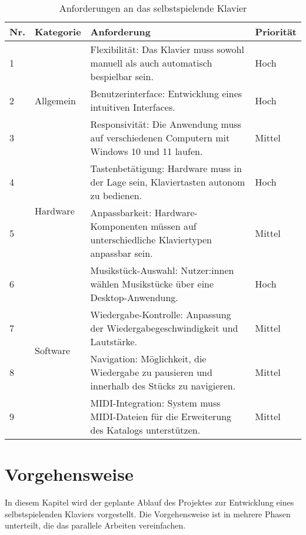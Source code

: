\begin{table}[ht]
    \centering
    \begin{tabular}{ | m{1cm} | m{2cm} | m{8cm} | m{2cm} | }
        \hline
        \textbf{Nr.} & \textbf{Kategorie} & \textbf{Anforderung} & \textbf{Priorität} \\
        \hline
        1 & \multirow{3}{2cm}{Allgemein} & Flexibilität: Das Klavier muss sowohl manuell als auch automatisch bespielbar sein. & Hoch \\
        \cline{1-1} \cline{3-4}
        2 & & Benutzerinterface: Entwicklung eines intuitiven Interfaces. & Hoch \\
        \cline{1-1} \cline{3-4}
        3 & & Responsivität: Die Anwendung muss auf verschiedenen Computern mit Windows 10 und 11 laufen. & Mittel \\
        \hline
        4 & \multirow{2}{2cm}{Hardware} & Tastenbetätigung: Hardware muss in der Lage sein, Klaviertasten autonom zu bedienen. & Hoch \\
        \cline{1-1} \cline{3-4}
        5 & & Anpassbarkeit: Hardware-Komponenten müssen auf unterschiedliche Klaviertypen anpassbar sein. & Mittel \\
        \hline
        6 & \multirow{4}{2cm}{Software} & Musikstück-Auswahl: Nutzer:innen wählen Musikstücke über eine Desktop-Anwendung. & Hoch \\
        \cline{1-1} \cline{3-4}
        7 & & Wiedergabe-Kontrolle: Anpassung der Wiedergabegeschwindigkeit und Lautstärke. & Mittel \\
        \cline{1-1} \cline{3-4}
        8 & & Navigation: Möglichkeit, die Wiedergabe zu pausieren und innerhalb des Stücks zu navigieren. & Mittel \\
        \cline{1-1} \cline{3-4}
        9 & & MIDI-Integration: System muss MIDI-Dateien für die Erweiterung des Katalogs unterstützen. & Mittel \\
        \hline
    \end{tabular}
    \caption{Anforderungen an das selbstspielende Klavier}
    \label{table:anforderungen}
\end{table}



\section{Vorgehensweise} \label{sec:zielstellung-vorgehen}

In diesem Kapitel wird der geplante Ablauf des Projektes zur Entwicklung eines selbstspielenden Klaviers vorgestellt.
Die Vorgehensweise ist in mehrere Phasen unterteilt, die das parallele Arbeiten vereinfachen. %

